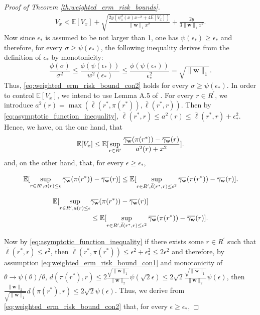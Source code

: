 \documentclass[letterpaper]{article} %
\def\DoubleColumn{}
\def\DoubleColumnEnd{}
\def\SingleColumn{}
\def\SingleColumnEnd{}
\newcommand{\E}{\mathbb{E}}
\newcommand{\overbar}[1]{\mkern 1.5mu\overline{\mkern-1.5mu#1\mkern-1.5mu}\mkern 1.5mu}
\newcommand*\cen[1]{\overbar{#1}}
\newcommand{\weight}{\mathbf{w}}
\newcommand{\relossf}{\bar{\ell}}
\newcommand{\cenprocess}[1]{\cen{\gamma_{#1}}}
\newcommand{\normo}[1]{\|#1\|_1}
\begin{document}
\begin{proof}[Proof of Theorem \ref{th:weighted_erm_risk_bounds}]
\begin{equation}
\begin{aligned}
            \label{eq:v_x_bennett_inequality}
            V_x < \E[V_x]+\sqrt{\frac{2y(\psi_1^2(x)x^{-2}+4\E[V_x])}{\normo{\weight{}}x^2}}+\frac{2y}{3\normo{\weight{}}x^2}.
        \end{aligned}
    \end{equation}
    Now since $\epsilon_*$ is assumed to be not larger than 1, one has $\psi(\epsilon_*)\ge \epsilon_*$ and therefore, for every $\sigma\ge \psi(\epsilon_*)$, the following inequality derives from the definition of $\epsilon_*$ by monotonicity:
    \[\frac{\phi(\sigma)}{\sigma^2}\le \frac{\phi(\psi(\epsilon_*))}{w^2(\epsilon_*)}\le \frac{\phi(\psi(\epsilon_*))}{\epsilon_*^2}=\sqrt{\normo{\weight{}}}.\]
    Thus, \eqref{eq:weighted_erm_risk_bound_con2} holds for every $\sigma\ge \psi(\epsilon_*)$. In order to control $\E[V_x]$, we intend to use Lemma A.5 of \cite{Massart2006}. 
    For every $r\in R^\prime$, we introduce $a^2(r)=\max(\relossf(r^*,\pi(r^*)),\relossf(r^*,r))$. Then by \eqref{eq:asymptotic_function_inequality}, $\relossf(r^*,r)\le a^2(r)\le \relossf(r^*,r)+\epsilon_*^2$. Hence, we have, on the one hand, that
    \[\E[V_x]\le \E[\sup_{r\in R^\prime}\frac{\cenprocess{\weight}(\pi(r^*))-\cenprocess{\weight}(r)}{a^2(r)+x^2}].\]
    and, on the other hand, that, for every $\epsilon\ge \epsilon_*$,
    \SingleColumn
    \[\E[\sup_{r\in R^\prime,a(r)\le \epsilon}\cenprocess{\weight}(\pi(r^*))-\cenprocess{\weight}(r)]\le \E[\sup_{r\in R^\prime,\relossf(r^*,r)\le \epsilon^2}\cenprocess{\weight}(\pi(r^*))-\cenprocess{\weight}(r)].\]
    \SingleColumnEnd
    \DoubleColumn
    \begin{align*}
        \E[\sup_{r\in R^\prime,a(r)\le \epsilon}&\cenprocess{\weight}(\pi(r^*))-\cenprocess{\weight}(r)]\\
        &\le \E[\sup_{r\in R^\prime,\relossf(r^*,r)\le \epsilon^2}\cenprocess{\weight}(\pi(r^*))-\cenprocess{\weight}(r)].
    \end{align*}
    \DoubleColumnEnd
    Now by \eqref{eq:asymptotic_function_inequality} if there exists some $r\in R^\prime$ such that $\relossf(r^*,r)\le \epsilon^2$, then $\relossf(r^*,\pi(r^*))\le \epsilon^2+\epsilon_*^2\le 2\epsilon^2$ and therefore, by assumption \eqref{eq:weighted_erm_risk_bound_con1} and monotonicity of $\theta\to \psi(\theta)/\theta$, $d(\pi(r^*),r)\le 2\frac{\sqrt{\normo{\weight{}}}}{\|\weight{}\|_2}\psi(\sqrt{2}\epsilon)\le 2\sqrt{2}\frac{\sqrt{\normo{\weight{}}}}{\|\weight{}\|_2}\psi(\epsilon)$, then $\frac{\|\weight{}\|_2}{\sqrt{\normo{\weight{}}}}d(\pi(r^*),r)\le 2\sqrt{2}\psi(\epsilon)$. Thus, we derive from \eqref{eq:weighted_erm_risk_bound_con2} that, for every $\epsilon\ge \epsilon_*$,

\end{proof}
\end{document}
